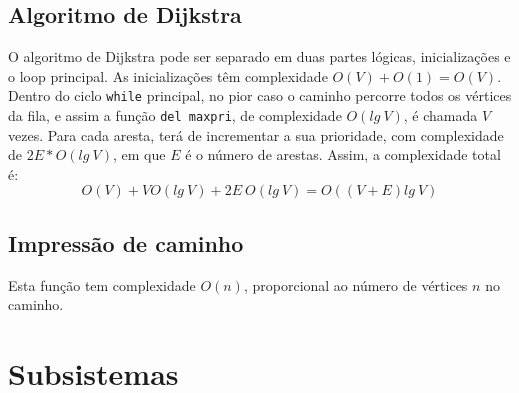 \documentclass[portuguese, a4paper]{article}
\newcommand\tu[0]{\textunderscore}
\begin{document}
	\subsection{Algoritmo de Dijkstra}
	\par
	O algoritmo de Dijkstra pode ser separado em duas partes lógicas,
	inicializações e o loop principal. As inicializações têm complexidade $O(V)
	+ O(1) = O(V)$.  Dentro do ciclo \texttt{while} principal, no pior caso o
	caminho percorre todos os vértices da fila, e assim a função \texttt{del\tu
	max\tu pri}, de complexidade $O(lg~V)$, é chamada $V$ vezes. Para cada
	aresta, terá de incrementar a sua prioridade, com complexidade de $2E *
	O(lg~V)$, em que $E$ é o número de arestas. Assim, a complexidade total é:
	\cite{randompdf}
	$$O(V) + VO(lg~V) + 2E~O(lg~V) = O((V + E)lg~V)$$

	\subsection{Impressão de caminho}
	\par
	Esta função tem complexidade $O(n)$, proporcional ao número de vértices $n$
	no caminho.


\section{Subsistemas}
\end{document}
